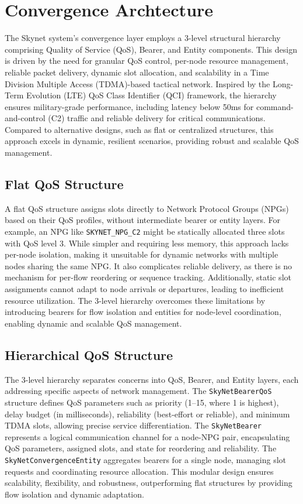 \documentclass{article}
\begin{document}
\section{Convergence Archtecture}
The Skynet system's convergence layer employs a 3-level structural hierarchy comprising
Quality of Service (QoS), Bearer, and Entity components. This design is driven by the
need for granular QoS control, per-node resource management, reliable packet delivery,
dynamic slot allocation, and scalability in a Time Division Multiple Access (TDMA)-based
tactical network. Inspired by the Long-Term Evolution (LTE) QoS Class Identifier (QCI)
framework, the hierarchy ensures military-grade performance, including latency below
50ms for command-and-control (C2) traffic and reliable delivery for critical communications.
Compared to alternative designs, such as flat or centralized structures, this approach
excels in dynamic, resilient scenarios, providing robust and scalable QoS management.

\subsection{Flat QoS Structure}
A flat QoS structure assigns slots directly to Network Protocol Groups (NPGs) based
on their QoS profiles, without intermediate bearer or entity layers. For example,
an NPG like \texttt{SKYNET\_NPG\_C2} might be statically allocated three slots with
QoS level 3. While simpler and requiring less memory, this approach lacks per-node
isolation, making it unsuitable for dynamic networks with multiple nodes sharing
the same NPG. It also complicates reliable delivery, as there is no mechanism for
per-flow reordering or sequence tracking. Additionally, static slot assignments
cannot adapt to node arrivals or departures, leading to inefficient resource
utilization. The 3-level hierarchy overcomes these limitations by introducing
bearers for flow isolation and entities for node-level coordination, enabling
 dynamic and scalable QoS management.

\subsection{Hierarchical QoS Structure}
The 3-level hierarchy separates concerns into QoS, Bearer, and Entity layers,
each addressing specific aspects of network management. The \texttt{SkyNetBearerQoS}
structure defines QoS parameters such as priority (1--15, where 1 is highest),
delay budget (in milliseconds), reliability (best-effort or reliable),
and minimum TDMA slots, allowing precise service differentiation.
The \texttt{SkyNetBearer} represents a logical communication channel for a node-NPG pair,
encapsulating QoS parameters, assigned slots, and state for reordering and reliability.
The \texttt{SkyNetConvergenceEntity} aggregates bearers for a single node,
managing slot requests and coordinating resource allocation.
This modular design ensures scalability, flexibility, and robustness,
outperforming flat structures by providing flow isolation and dynamic adaptation.
\end{document}

